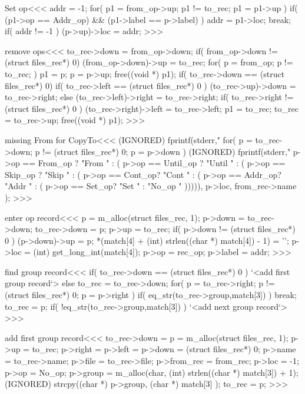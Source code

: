 \<Set op\><<<
addr = -1;
for( p1 = from_op->up; p1 != to_rec;  p1 = p1->up ){  
  if( (p1->op == Addr_op) && (p1->label == p->label) ){
    addr = p1->loc; break;
} }
if( addr != -1 ){ (p->up)->loc = addr; }
>>>


\<remove ops\><<<
to_rec->down = from_op->down;
if( from_op->down != (struct files_rec*) 0){
    (from_op->down)->up = to_rec;
} 
for( p = from_op; p != to_rec; ){
  p1 = p;  p = p->up; free((void *)  p1);  
}
if( to_rec->down == (struct files_rec*) 0){
  if( to_rec->left == (struct files_rec*) 0 ){
    (to_rec->up)->down =  to_rec->right;
  } else {
    (to_rec->left)->right = to_rec->right;
  }
  if( to_rec->right != (struct files_rec*) 0 ){
    (to_rec->right)->left = to_rec->left;
  }
  p1 = to_rec; to_rec = to_rec->up;  free((void *)  p1);
}
>>>

\<missing From for CopyTo\><<<
(IGNORED) fprintf(stderr,"%
for( p = to_rec->down; p != (struct files_rec*) 0;  p = p->down ){
  (IGNORED) fprintf(stderr,"   %
          p->op == From_op ?  "From  " :
             ( p->op == Until_op ?   "Until " :
               ( p->op == Skip_op ?   "Skip  " :
                 ( p->op == Cont_op?   "Cont " :
                 ( p->op == Addr_op?   "Addr " :
                 ( p->op == Set_op?   "Set " : "No_op " ))))),
          p->loc, from_rec->name
         );
}
>>>




\<enter op record\><<<
p = m_alloc(struct files_rec, 1);
p->down = to_rec->down;  to_rec->down = p;
p->up = to_rec;
if( p->down != (struct files_rec*) 0 ){
  (p->down)->up = p;
}
*(match[4] + (int) strlen((char *) match[4]) - 1) = '\0';
p->loc = (int) get_long_int(match[4]);
p->op  = rec_op;
p->label = addr;
>>>

\<find group record\><<<
if( to_rec->down == (struct files_rec*) 0 ){
  `<add first group record`>
} else {
  to_rec = to_rec->down;
  for( p = to_rec->right; p != (struct files_rec*) 0;  p = p->right ){
    if( eq_str(to_rec->group,match[3]) ){ break; }
    to_rec = p;
  }
  if( !eq_str(to_rec->group,match[3]) ){ 
    `<add next group record`>
} }
>>>



\<add first group record\><<<
to_rec->down = p = m_alloc(struct files_rec, 1);  
p->up = to_rec;
p->right = p->left = p->down = (struct files_rec*) 0;
p->name = to_rec->name;  
p->file = to_rec->file;  
p->from_rec = from_rec;  
p->loc = -1;  
p->op = No_op;
p->group = m_alloc(char, (int) strlen((char *) match[3]) + 1);
(IGNORED) strcpy((char *)  p->group, (char *) match[3] );
to_rec = p;
>>>

